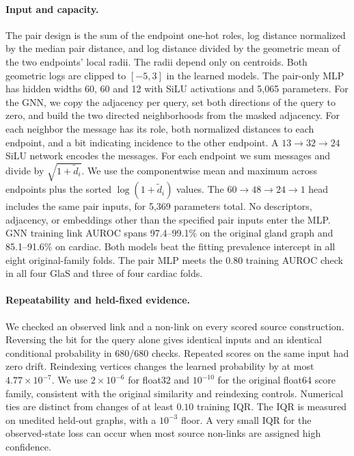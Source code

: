 \paragraph{Input and capacity.}
The pair design is the sum of the endpoint one-hot roles, log distance normalized by the median pair distance, and log distance divided by the geometric mean of the two endpoints' local radii. The radii depend only on centroids. Both geometric logs are clipped to $[-5,3]$ in the learned models. The pair-only MLP has hidden widths 60, 60 and 12 with SiLU activations and 5,065 parameters. For the GNN, we copy the adjacency per query, set both directions of the query to zero, and build the two directed neighborhoods from the masked adjacency. For each neighbor the message has its role, both normalized distances to each endpoint, and a bit indicating incidence to the other endpoint. A $13\to32\to24$ SiLU network encodes the messages. For each endpoint we sum messages and divide by $\sqrt{1+\tilde d_i}$. We use the componentwise mean and maximum across endpoints plus the sorted $\log(1+\tilde d_i)$ values. The $60\to48\to24\to1$ head includes the same pair inputs, for 5,369 parameters total. No descriptors, adjacency, or embeddings other than the specified pair inputs enter the MLP. GNN training link AUROC spans 97.4--99.1\% on the original gland graph and 85.1--91.6\% on cardiac. Both models beat the fitting prevalence intercept in all eight original-family folds. The pair MLP meets the 0.80 training AUROC check in all four GlaS and three of four cardiac folds.

\paragraph{Repeatability and held-fixed evidence.}
We checked an observed link and a non-link on every scored source construction. Reversing the bit for the query alone gives identical inputs and an identical conditional probability in 680/680 checks. Repeated scores on the same input had zero drift. Reindexing vertices changes the learned probability by at most $4.77\times10^{-7}$. We use $2\times10^{-6}$ for float32 and $10^{-10}$ for the original float64 score family, consistent with the original similarity and reindexing controls. Numerical ties are distinct from changes of at least $0.10$ training IQR. The IQR is measured on unedited held-out graphs, with a $10^{-3}$ floor. A very small IQR for the observed-state loss can occur when most source non-links are assigned high confidence.

